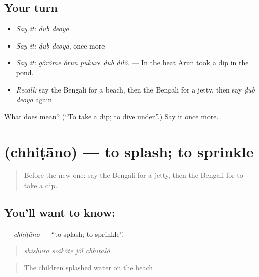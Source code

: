 \subsection*{Your turn}
\begin{itemize}
\raggedright
  \item \emph{Say it:} \emph{ḍub deoyā}
  \item \emph{Say it:} \emph{ḍub deoyā}, once more
  \item \emph{Say it:} \emph{gôrôme ôrun pukure ḍub dilô.} — In the heat Arun took a dip in the pond.
  \item \emph{Recall:} say the Bengali for a beach, then the Bengali for a jetty, then say \emph{ḍub deoyā} again
\end{itemize}

\begin{tcolorbox}[breakable,colback=teal!4,colframe=teal!35!black,title={Before you move on}]
What does   mean? (\textquotedblleft{}To take a dip; to dive under\textquotedblright{}.) Say it once more.
\end{tcolorbox}
\section[\texorpdfstring{\bn{ছিটানো} (chhiṭāno)}{ছিটানো (chhiṭāno)}]{ (chhiṭāno) — to splash; to sprinkle}

\label{lesson:BN-C398-chhitano}



\begin{quote}
Before the new one: say the Bengali for a jetty, then the Bengali for to take a dip.
\end{quote}

\subsection*{You'll want to know: }
\textbf{} — \emph{chhiṭāno} — \textquotedblleft{}to splash; to sprinkle\textquotedblright{}.

\begin{quote}
   
\end{quote}

\begin{quote}
\emph{shishurā soikôte jôl chhiṭālô.}
\end{quote}

\begin{quote}
The children splashed water on the beach.
\end{quote}

